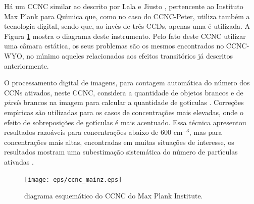 H\'{a} um CCNC similar ao descrito por Lala e Jiusto \cite{Lala}, pertencente ao Instituto Max Plank para Qu\'{\i}mica que, como no caso do CCNC-Peter, utiliza tamb\'{e}m a tecnologia digital, sendo que, ao inv\'{e}s de tr\^{e}s CCDs, apenas uma \'{e} utilizada. A Figura \ref{ccncmainz} mostra o diagrama deste instrumento. Pelo fato deste CCNC utilizar uma c\^{a}mara est\'{a}tica, os seus problemas  s\~{a}o os mesmos encontrados no CCNC-WYO, no m\'{\i}nimo aqueles relacionados aos efeitos transit\'{o}rios j\'{a} descritos anteriormente.

O processamento digital de imagens, para contagem autom\'{a}tica do n\'{u}mero dos CCNs ativados, neste CCNC, considera a quantidade de objetos brancos e de \emph{pixels} brancos na imagem  para calcular a quantidade de got\'{\i}culas \cite{Frank}. Corre\c{c}\~{o}es emp\'{\i}ricas s\~{a}o utilizadas para os casos de concentra\c{c}\~{o}es mais elevadas, onde o efeito de sobreposi\c{c}\~{o}es de got\'{\i}culas \'{e} mais acentuado. Essa t\'{e}cnica apresentou resultados razo\'{a}veis para  concentra\c{c}\~{o}es  abaixo de 600 cm$^{-3}$, mas para concentra\c{c}\~{o}es mais altas, encontradas em muitas situa\c{c}\~{o}es de interesse, os resultados mostram uma subestima\c{c}\~{a}o sistem\'{a}tica do n\'{u}mero de part\'{\i}culas ativadas \cite{Frank,Rose}.


\begin{figure}[!hbt]
\begin{center}
\texttt{[image: eps/ccnc\_mainz.eps]}\\
\end{center}
\caption{\label{ccncmainz}\hspace{-0.1em} diagrama esquem\'{a}tico do CCNC do Max Plank Institute.}
\end{figure}
